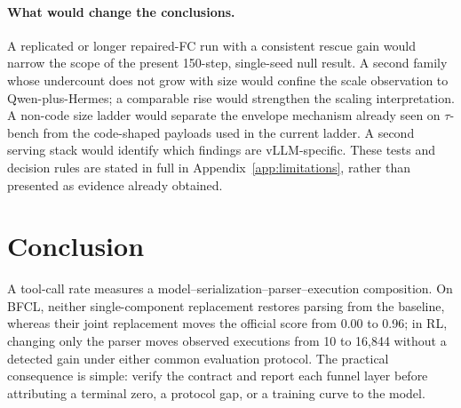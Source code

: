 \paragraph{What would change the conclusions.} A replicated or longer repaired-FC run with a
consistent rescue gain would narrow the scope of the present 150-step, single-seed null result. A second family
whose undercount does not grow with size would confine the scale observation to Qwen-plus-Hermes;
a comparable rise would strengthen the scaling interpretation. A non-code size ladder would
separate the envelope mechanism already seen on $\tau$-bench from the code-shaped payloads used in
the current ladder. A second serving stack would identify which findings are vLLM-specific. These
tests and decision rules are stated in full in Appendix~\ref{app:limitations}, rather than
presented as evidence already obtained.

\section{Conclusion}

A tool-call rate measures a model--serialization--parser--execution composition. On BFCL, neither
single-component replacement restores parsing from the baseline, whereas their joint replacement moves the official score from 0.00
to 0.96; in RL, changing only the parser moves observed executions from 10 to 16,844 without a
detected gain under either common evaluation protocol. The practical consequence is simple: verify the contract and report each
funnel layer before attributing a terminal zero, a protocol gap, or a training curve to the model.
